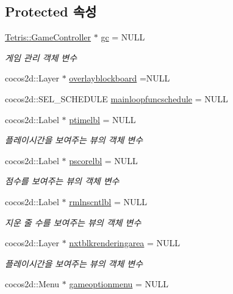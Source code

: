 \subsection*{Protected 속성}
\begin{DoxyCompactItemize}
\item 
\hyperlink{class_tetris_1_1_game_controller}{Tetris\+::\+Game\+Controller} $\ast$ \hyperlink{class_hello_world_a547cb213126911d9a7151f8259dc7102}{gc} = N\+U\+LL
\begin{DoxyCompactList}\small\item\em 게임 관리 객체 변수 \end{DoxyCompactList}\item 
cocos2d\+::\+Layer $\ast$ \hyperlink{class_hello_world_acc967707dff45c20f68321f07c86a21b}{overlayblockboard} =N\+U\+LL
\item 
cocos2d\+::\+S\+E\+L\+\_\+\+S\+C\+H\+E\+D\+U\+LE \hyperlink{class_hello_world_a01e6475e24156e4f8b396c8e726f6260}{mainloopfuncschedule} = N\+U\+LL
\item 
cocos2d\+::\+Label $\ast$ \hyperlink{class_hello_world_ae0520bbadc78c24a50ddeb3f839b4012}{ptimelbl} = N\+U\+LL
\begin{DoxyCompactList}\small\item\em 플레이시간을 보여주는 뷰의 객체 변수 \end{DoxyCompactList}\item 
cocos2d\+::\+Label $\ast$ \hyperlink{class_hello_world_a7ed25294d2c42aec8b7b8f37bbf75a38}{pscorelbl} = N\+U\+LL
\begin{DoxyCompactList}\small\item\em 점수를 보여주는 뷰의 객체 변수 \end{DoxyCompactList}\item 
cocos2d\+::\+Label $\ast$ \hyperlink{class_hello_world_a52aca4f2a78e6413ace505d313b006fc}{rmlnscntlbl} = N\+U\+LL
\begin{DoxyCompactList}\small\item\em 지운 줄 수를 보여주는 뷰의 객체 변수 \end{DoxyCompactList}\item 
cocos2d\+::\+Layer $\ast$ \hyperlink{class_hello_world_a6ebd3cb915150357bd357df1ff4da932}{nxtblkrenderingarea} = N\+U\+LL
\begin{DoxyCompactList}\small\item\em 플레이시간을 보여주는 뷰의 객체 변수 \end{DoxyCompactList}\item 
cocos2d\+::\+Menu $\ast$ \hyperlink{class_hello_world_aeb27a8750393a2d4982809b64454a045}{gameoptionmenu} = N\+U\+LL

\end{DoxyCompactItemize}
